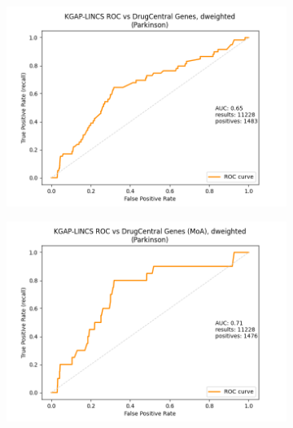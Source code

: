 \begin{figure}[h]

\begin{subfigure}{0.5\textwidth}
\includegraphics[width=0.95\linewidth]{figures/kgap/KGAP-LINCS_ROC_dweighted_Parkinson.png} 
\caption{}
\label{fig:KGAP-LINCS_ROCsa}
\end{subfigure}
\begin{subfigure}{0.5\textwidth}
\includegraphics[width=0.95\linewidth]{figures/kgap/KGAP-LINCS_ROC_dweighted_MoA_Parkinson.png}
\caption{}
\label{fig:KGAP-LINCS_ROCsb}
\end{subfigure}


\end{figure}
